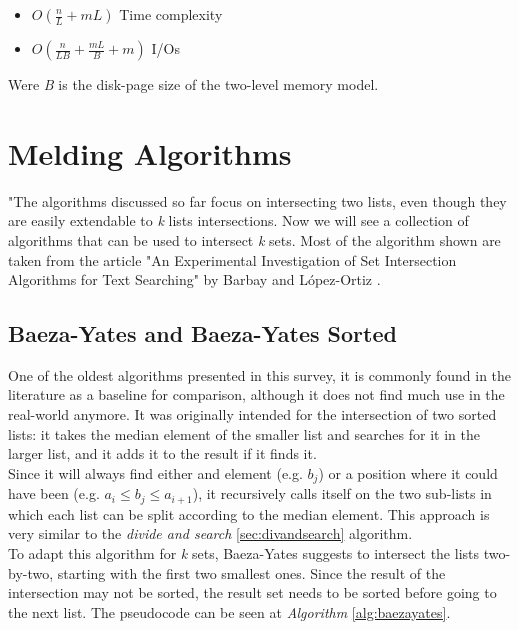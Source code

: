 \begin{itemize}
    \item $O \left( \frac{n}{L} +mL \right)$ Time complexity
    \item $O \left( \frac{n}{LB} + \frac{mL}{B} +m \right)$ I/Os 
\end{itemize}

Were \textit{B} is the disk-page size of the two-level memory model.

\section{Melding Algorithms}

"The algorithms discussed so far focus on intersecting two lists, even though they are easily extendable to \textit{k} lists intersections. Now we will see a collection of algorithms that can be used to intersect \textit{k} sets. Most of the algorithm shown are taken from the article "An Experimental Investigation of Set Intersection Algorithms for Text Searching" by Barbay and López-Ortiz \citep{barbay_ortiz}.

\subsection{Baeza-Yates and Baeza-Yates Sorted \label{sec:baezayates}}

One of the oldest algorithms presented in this survey, it is commonly found in the literature as a baseline for comparison, although it does not find much use in the real-world anymore. It was originally intended for the intersection of two sorted lists: it takes the median element of the smaller list and searches for it in the larger list, and it adds it to the result if it finds it.\\   
Since it will always find either and element (e.g. $b_j$) or a position where it could have been (e.g. $a_i \leq b_j \leq a_{i+1}$), it recursively calls itself on the two sub-lists in which each list can be split according to the median element. This approach is very similar to the \textit{divide and search} \ref{sec:divandsearch} algorithm.\\
To adapt this algorithm for \textit{k} sets, Baeza-Yates suggests to intersect the lists two-by-two, starting with the first two smallest ones. Since the result of the intersection may not be sorted, the result set needs to be sorted before going to the next list. The pseudocode can be seen at \textit{Algorithm} \ref{alg:baezayates}.

